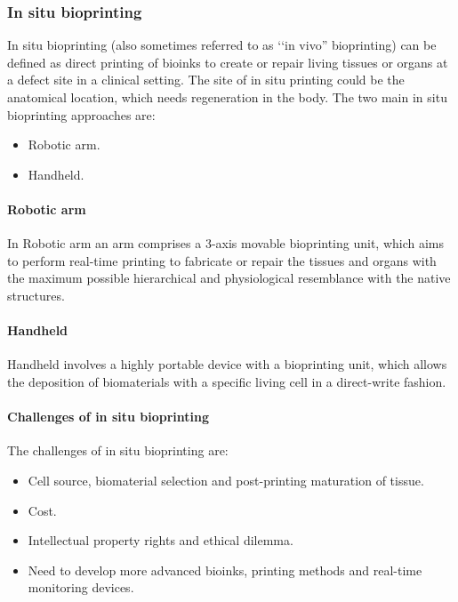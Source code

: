 		\subsubsection{In situ bioprinting}
		In situ bioprinting (also sometimes referred to as ‘‘in vivo” bioprinting) can be defined as direct printing of bioinks to create or repair living tissues or organs at a defect site in a clinical setting.
		The site of in situ printing could be the anatomical location, which needs regeneration in the body.
		The two main in situ bioprinting approaches are:

		\begin{multicols}{2}
			\begin{itemize}
				\item Robotic arm.
				\item Handheld.
			\end{itemize}
		\end{multicols}

			\paragraph{Robotic arm}
			In Robotic arm an arm comprises a 3-axis movable bioprinting unit, which aims to perform real-time printing to fabricate or repair the tissues and organs with the maximum possible hierarchical and physiological resemblance with the native structures.

			\paragraph{Handheld}
			Handheld involves a highly portable device with a bioprinting unit, which allows the deposition of biomaterials with a specific living cell in a direct-write fashion.

			\paragraph{Challenges of in situ bioprinting}
			The challenges of in situ bioprinting are:

			\begin{multicols}{2}
				\begin{itemize}
					\item Cell source, biomaterial selection and post-printing maturation of tissue.
					\item Cost.
					\item Intellectual property rights and ethical dilemma.
					\item Need to develop more advanced bioinks, printing methods and real-time monitoring devices.
				\end{itemize}
			\end{multicols}
